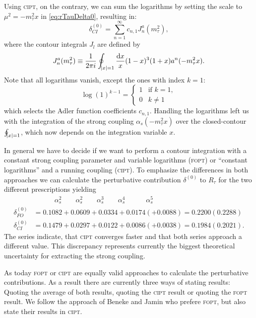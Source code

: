 \documentclass[../../index.tex]{subfiles}
\begin{document}
Using \textsc{cipt}, on the contrary, we can sum the logarithms by setting the
scale to \(\mu^2 = -m_\tau^2 x\) in \cref{eq:rTauDelta0}, resulting in:
\begin{equation}
  \delta^{(0)}_{CI} = \sum_{n=1}^\infty c_{n,1} J_n^a(m_\tau^2),
\end{equation}
where the contour integrals $J_l$ are defined by
\begin{equation}
  J_n^a(m_\tau^2) \equiv \frac{1}{2 \pi i} \oint_{\abs{x}=1} \frac{\dif x}{x} (1-x)^3(1+x) a^n(-m_\tau^2 x).
\end{equation}
Note that all logarithms vanish, except the ones with index \(k=1\):
\begin{equation}
  \log(1)^{k-1} =  \begin{cases} \mbox{1} & \mbox{if } k=1, \\ \mbox{0} & k\neq 1 \end{cases}
\end{equation}
which selects the Adler function coefficients \(c_{n,1}\). Handling the
logarithms left us with the integration of the strong coupling \(\alpha_s(-
m_\tau^2 x)\) over the closed-contour \(\oint_{\abs{x}=1}\), which now depends
on the integration variable \(x\).

In general we have to decide if we want to perform a contour integration with a
constant strong coupling parameter and variable logarithms (\textsc{fopt}) or
``constant logarithms'' and a running coupling (\textsc{cipt}). To emphasize the
differences in both approaches we can calculate the perturbative contribution
\(\delta^{(0)}\) to \(R_\tau\) for the two different prescriptions yielding
\cite{Beneke2008}
\begin{align}
  & \quad\qquad \alpha_s^2 \qquad \alpha_s^2 \qquad \alpha_s^3 \qquad \alpha_s^4 \quad\qquad \alpha_s^5 \nonumber\\
  \delta_{FO}^{(0)} &= 0.1082 + 0.0609 + 0.0334 + 0.0174 (+ 0.0088) = 0.2200 (0.2288) \\
  \delta_{CI}^{(0)} &= 0.1479 + 0.0297 + 0.0122 + 0.0086 (+ 0.0038) = 0.1984 (0.2021).
\end{align}
The series indicate, that \textsc{cipt} converges faster and that both series
approach a different value. This discrepancy represents currently the biggest
theoretical uncertainty for extracting the strong coupling.

As today \textsc{fopt} or \textsc{cipt} are equally valid approaches to
calculate the perturbative contributions. As a result there are currently three
ways of stating results: Quoting the average of both results, quoting the
\textsc{cipt} result or quoting the \textsc{fopt} result. We follow the approach
of Beneke and Jamin \cite{Beneke2008} who prefere \textsc{fopt}, but also state
their results in \textsc{cipt}.
\end{document}
